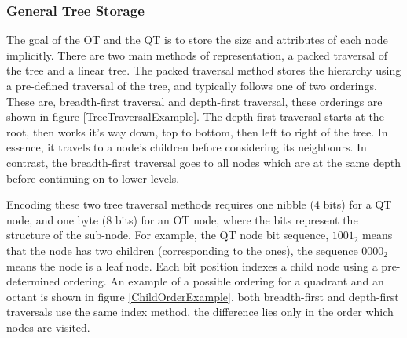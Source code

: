 
\subsubsection{General Tree Storage}

The goal of the OT and the QT is to store the size and attributes of each node implicitly. There are two main methods of representation, a packed traversal of the tree and a linear tree. The packed traversal method stores the hierarchy using a pre-defined traversal of the tree, and typically follows one of two orderings. These are, breadth-first traversal and depth-first traversal, these orderings are shown in figure \ref{TreeTraversalExample}. The depth-first traversal starts at the root, then works it's way down, top to bottom, then left to right of the tree. In essence, it travels to a node's children before considering its neighbours. In contrast, the breadth-first traversal goes to all nodes which are at the same depth before continuing on to lower levels. 


Encoding these two tree traversal methods requires one nibble (4 bits) for a QT node, and one byte (8 bits) for an OT node, where the bits represent the structure of the sub-node. For example, the QT node bit sequence, $1001_2$ means that the node has two children (corresponding to the ones), the sequence $0000_2$ means the node is a leaf node. Each bit position indexes a child node using a pre-determined ordering. An example of a possible ordering for a quadrant and an octant is shown in figure \ref{ChildOrderExample}, both breadth-first and depth-first traversals use the same index method, the difference lies only in the order which nodes are visited. 


